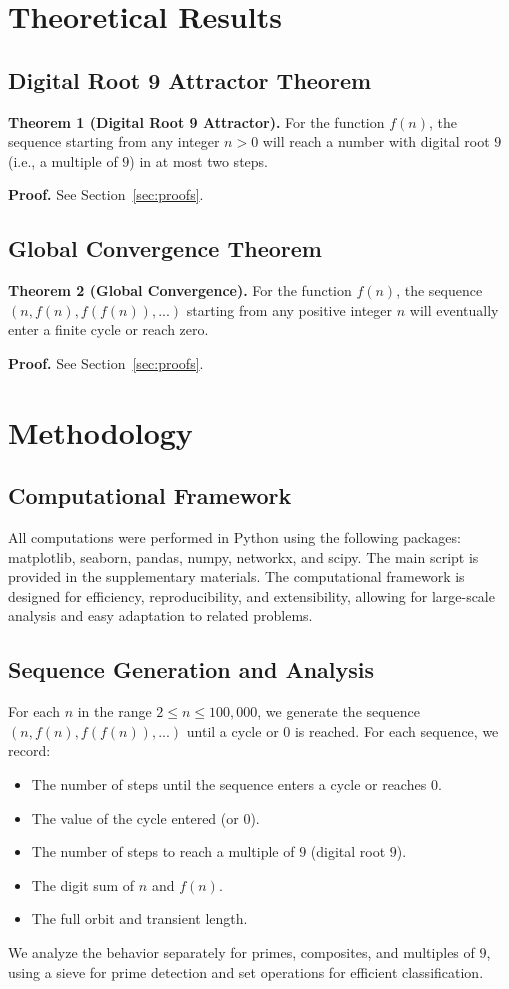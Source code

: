 \documentclass[12pt]{article}
\begin{document}
\section{Theoretical Results}
\subsection{Digital Root 9 Attractor Theorem}
\textbf{Theorem 1 (Digital Root 9 Attractor).} For the function $f(n)$, the sequence starting from any integer $n > 0$ will reach a number with digital root $9$ (i.e., a multiple of $9$) in at most two steps.

\textbf{Proof.} See Section~\ref{sec:proofs}.

\subsection{Global Convergence Theorem}
\textbf{Theorem 2 (Global Convergence).} For the function $f(n)$, the sequence $(n, f(n), f(f(n)), ...)$ starting from any positive integer $n$ will eventually enter a finite cycle or reach zero.

\textbf{Proof.} See Section~\ref{sec:proofs}.


\section{Methodology}
\subsection{Computational Framework}
All computations were performed in Python using the following packages: matplotlib, seaborn, pandas, numpy, networkx, and scipy. The main script is provided in the supplementary materials. The computational framework is designed for efficiency, reproducibility, and extensibility, allowing for large-scale analysis and easy adaptation to related problems.

\subsection{Sequence Generation and Analysis}
For each $n$ in the range $2 \leq n \leq 100,000$, we generate the sequence $(n, f(n), f(f(n)), ...)$ until a cycle or $0$ is reached. For each sequence, we record:
\begin{itemize}
    \item The number of steps until the sequence enters a cycle or reaches $0$.
    \item The value of the cycle entered (or $0$).
    \item The number of steps to reach a multiple of $9$ (digital root $9$).
    \item The digit sum of $n$ and $f(n)$.
    \item The full orbit and transient length.
\end{itemize}
We analyze the behavior separately for primes, composites, and multiples of $9$, using a sieve for prime detection and set operations for efficient classification.
\end{document}

